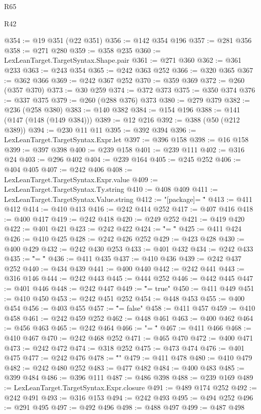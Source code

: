\begin{lexlean}{R65}
\begin{lexlean}{R42}
\begin{coremodule}
{{{{{{{{{{{{{{{{{{{{{{{{{{{{{{{{{{{{{{{{{{{{{{{{{{{{{{{{{{{{{{{{{{{{{{{{{{{{{{{{{{{{{{{{{{{{{{{{{{{{{{{{{{{{{{{{{{{{{{{{{{{{{{{{{{{{{{{{{{{{{{{{{{{{{{{{{{{{{{{{{{{{{{{{{{{{{{{{{{{{{{{@354 := @19 @351 (@22 @351)
@356 := @142 @354 @196
@357 := @281 @356
@358 := @271 @280
@359 := @358 @235
@360 := LexLeanTarget.TargetSyntax.Shape.pair
@361 := @271 @360
@362 := @361 @233
@363 := @243 @354
@365 := @242 @363 @252
@366 := @320 @365
@367 := @362 @366
@369 := @242 @367 @252
@370 := @359 @369
@372 := @260 (@357 @370)
@373 := @30 @259
@374 := @372 @373
@375 := @350 @374
@376 := @337 @375
@379 := @260 (@288 @376) @373
@380 := @279 @379
@382 := @236 (@258 @380)
@383 := @140 @382
@384 := @154 @196
@388 := @141 (@147 (@148 (@149 @384)))
@389 := @12 @216
@392 := @388 (@50 (@212 @389))
@394 := @230 @11 @11
@395 := @392 @394
@396 := LexLeanTarget.TargetSyntax.Expr.let
@397 := @396 @158
@398 := @16 @158
@399 := @397 @398
@400 := @239 @158
@401 := @239 @111
@402 := @316 @24
@403 := @296 @402
@404 := @239 @164
@405 := @245 @252
@406 := @404 @405
@407 := @242 @406
@408 := LexLeanTarget.TargetSyntax.Expr.value
@409 := LexLeanTarget.TargetSyntax.Ty.string
@410 := @408 @409
@411 := LexLeanTarget.TargetSyntax.Value.string
@412 := "[package]\nname = \""
@413 := @411 @412
@414 := @410 @413
@416 := @242 @414 @252
@417 := @407 @416
@418 := @400 @417
@419 := @242 @418
@420 := @249 @252
@421 := @419 @420
@422 := @401 @421
@423 := @242 @422
@424 := "\"\nversion = \""
@425 := @411 @424
@426 := @410 @425
@428 := @242 @426 @252
@429 := @423 @428
@430 := @400 @429
@432 := @242 @430 @253
@433 := @401 @432
@434 := @242 @433
@435 := "\"\nedition = \""
@436 := @411 @435
@437 := @410 @436
@439 := @242 @437 @252
@440 := @434 @439
@441 := @400 @440
@442 := @242 @441
@443 := @316 @146
@444 := @242 @443
@445 := @444 @252
@446 := @442 @445
@447 := @401 @446
@448 := @242 @447
@449 := "\"\npublish = true"
@450 := @411 @449
@451 := @410 @450
@453 := @242 @451 @252
@454 := @448 @453
@455 := @400 @454
@456 := @403 @455
@457 := "\"\npublish = false"
@458 := @411 @457
@459 := @410 @458
@461 := @242 @459 @252
@462 := @448 @461
@463 := @400 @462
@464 := @456 @463
@465 := @242 @464
@466 := "\n\n[lib]\npath = \""
@467 := @411 @466
@468 := @410 @467
@470 := @242 @468 @252
@471 := @465 @470
@472 := @400 @471
@473 := @242 @472
@474 := @318 @252
@475 := @473 @474
@476 := @401 @475
@477 := @242 @476
@478 := "\"\n{}\n"
@479 := @411 @478
@480 := @410 @479
@482 := @242 @480 @252
@483 := @477 @482
@484 := @400 @483
@485 := @399 @484
@486 := @396 @111
@487 := @486 @398
@488 := @239 @169
@489 := LexLeanTarget.TargetSyntax.Expr.closure
@491 := @489 @174 @252
@492 := @242 @491
@493 := @316 @153
@494 := @242 @493
@495 := @494 @252
@496 := @291 @495
@497 := @492 @496
@498 := @488 @497
@499 := @487 @498
}}}}}}}}}}}}}}}}}}}}}}}}}}}}}}}}}}}}}}}}}}}}}}}}}}}}}}}}}}}}}}}}}}}}}}}}}}}}}}}}}}}}}}}}}}}}}}}}}}}}}}}}}}}}}}}}}}}}}}}}}}}}}}}}}}}}}}}}}}}}}}}}}}}}}}}}}}}}}}}}}}}}}}}}}}}}}}}}}}}}}}}
\end{coremodule}
\end{lexlean}
\end{lexlean}

